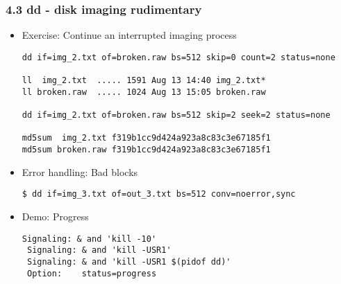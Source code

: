 \begin{frame}[fragile]
  \frametitle{4.3 dd - disk imaging rudimentary}
    \begin{itemize}
        \item[] Exercise: Continue an interrupted imaging process
\begin{lstlisting}[basicstyle=\tiny]
dd if=img_2.txt of=broken.raw bs=512 skip=0 count=2 status=none

ll  img_2.txt  ..... 1591 Aug 13 14:40 img_2.txt*
ll broken.raw  ..... 1024 Aug 13 15:05 broken.raw

dd if=img_2.txt of=broken.raw bs=512 skip=2 seek=2 status=none

md5sum  img_2.txt f319b1cc9d424a923a8c83c3e67185f1
md5sum broken.raw f319b1cc9d424a923a8c83c3e67185f1
\end{lstlisting}
        \item[] Error handling: Bad blocks
\begin{lstlisting}[basicstyle=\tiny]
$ dd if=img_3.txt of=out_3.txt bs=512 conv=noerror,sync
\end{lstlisting}
        \item[] Demo: Progress
\begin{lstlisting}[basicstyle=\tiny]
 Signaling: & and 'kill -10'
 Signaling: & and 'kill -USR1'
 Signaling: & and 'kill -USR1 $(pidof dd)'
 Option:    status=progress
\end{lstlisting}
    \end{itemize}
\end{frame}


